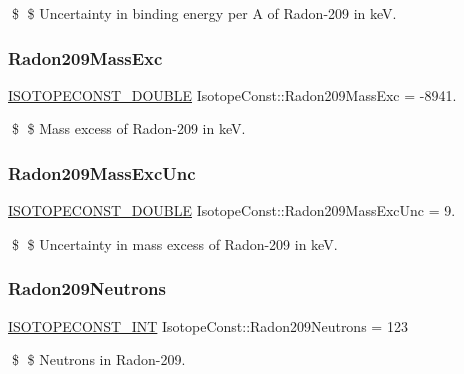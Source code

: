 \$ \$ Uncertainty in binding energy per A of Radon-\/209 in keV. \mbox{\label{group___isotope_const-_radon-_rn209_gae37d654b033f9d49cc41d805e1132656}} 
\subsubsection{\texorpdfstring{Radon209\+Mass\+Exc}{Radon209MassExc}}
{\footnotesize\ttfamily \mbox{\hyperlink{group___isotope_const-_macros_ga8f45a7272ce02c0b4c65c44636ed719a}{I\+S\+O\+T\+O\+P\+E\+C\+O\+N\+S\+T\+\_\+\+D\+O\+U\+B\+LE}} Isotope\+Const\+::\+Radon209\+Mass\+Exc = -\/8941.}

\$ \$ Mass excess of Radon-\/209 in keV. \mbox{\label{group___isotope_const-_radon-_rn209_ga1b9d492e71d398d96885985f23e4760c}} 
\subsubsection{\texorpdfstring{Radon209\+Mass\+Exc\+Unc}{Radon209MassExcUnc}}
{\footnotesize\ttfamily \mbox{\hyperlink{group___isotope_const-_macros_ga8f45a7272ce02c0b4c65c44636ed719a}{I\+S\+O\+T\+O\+P\+E\+C\+O\+N\+S\+T\+\_\+\+D\+O\+U\+B\+LE}} Isotope\+Const\+::\+Radon209\+Mass\+Exc\+Unc = 9.}

\$ \$ Uncertainty in mass excess of Radon-\/209 in keV. \mbox{\label{group___isotope_const-_radon-_rn209_ga4969a89f7d9c38d97700f22520dc519c}} 
\subsubsection{\texorpdfstring{Radon209\+Neutrons}{Radon209Neutrons}}
{\footnotesize\ttfamily \mbox{\hyperlink{group___isotope_const-_macros_ga5f18360b3e99483a35c32d789e62621c}{I\+S\+O\+T\+O\+P\+E\+C\+O\+N\+S\+T\+\_\+\+I\+NT}} Isotope\+Const\+::\+Radon209\+Neutrons = 123}

\$ \$ Neutrons in Radon-\/209. \mbox{\label{group___isotope_const-_radon-_rn209_gad0029049e578170ee7f7fd952f1dbdeb}} 
